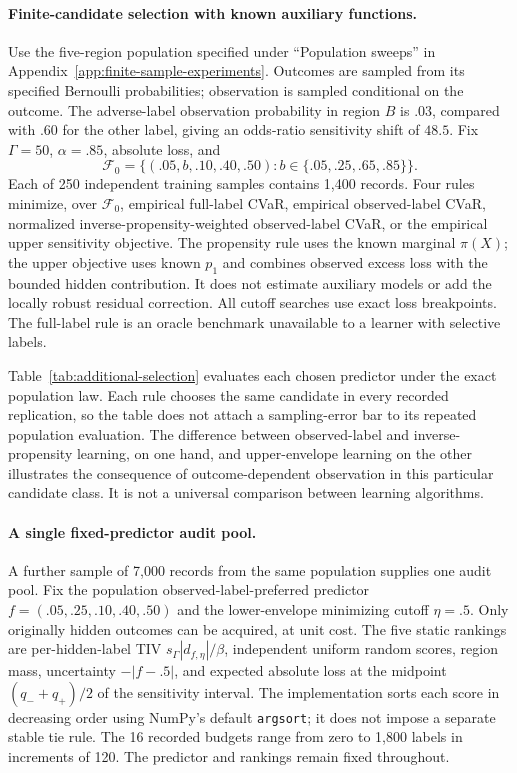 \paragraph{Finite-candidate selection with known auxiliary functions.}
Use the five-region population specified under ``Population sweeps'' in
Appendix~\ref{app:finite-sample-experiments}. Outcomes are sampled from its
specified Bernoulli probabilities; observation is sampled conditional on the
outcome. The adverse-label observation probability in region $B$ is $.03$,
compared with $.60$ for the other label, giving an odds-ratio sensitivity shift
of $48.5$. Fix $\Gamma=50$, $\alpha=.85$, absolute loss, and
\[
 \mathcal F_0=\{(.05,b,.10,.40,.50):b\in\{.05,.25,.65,.85\}\}.
\]
Each of 250 independent training samples contains 1,400 records. Four rules
minimize, over $\mathcal F_0$, empirical full-label CVaR, empirical observed-label
CVaR, normalized inverse-propensity-weighted observed-label CVaR, or the empirical
upper sensitivity objective. The propensity rule uses the known marginal
$\pi(X)$; the upper objective uses known $p_1$ and combines observed excess loss
with the bounded hidden contribution. It does not estimate auxiliary models or
add the locally robust residual correction. All cutoff searches use exact loss
breakpoints. The full-label rule is an oracle benchmark unavailable to a learner
with selective labels.

Table~\ref{tab:additional-selection} evaluates each chosen predictor under the
exact population law. Each rule chooses the same candidate in every recorded
replication, so the table does not attach a sampling-error bar to its repeated
population evaluation. The difference between observed-label and
inverse-propensity learning, on one hand, and upper-envelope learning on the
other illustrates the consequence of outcome-dependent observation in this
particular candidate class. It is not a universal comparison between learning
algorithms.

\SupplementFiniteChoiceTable

\paragraph{A single fixed-predictor audit pool.}
A further sample of 7,000 records from the same population supplies one audit
pool. Fix the population observed-label-preferred predictor
$f=(.05,.25,.10,.40,.50)$ and the lower-envelope minimizing cutoff $\eta=.5$.
Only originally hidden outcomes can be acquired, at unit cost. The five static
rankings are per-hidden-label TIV $s_\Gamma|d_{f,\eta}|/\beta$, independent
uniform random scores, region mass, uncertainty $-|f-.5|$, and expected absolute
loss at the midpoint $(q_-+q_+)/2$ of the sensitivity interval. The implementation
sorts each score in decreasing order using NumPy's default \texttt{argsort}; it
does not impose a separate stable tie rule. The 16 recorded budgets range from
zero to 1,800 labels in increments of 120. The predictor and rankings remain
fixed throughout.

